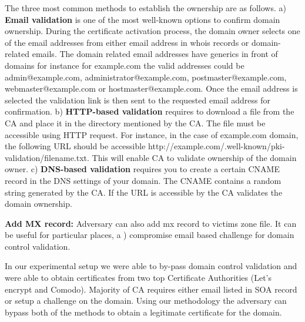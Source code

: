 The three most common methods to establish the ownership are as follows. 
a) \textbf {Email validation} is one of the most well-known options to confirm domain ownership. During the certificate activation process, the domain owner selects one of the email addresses from either email address in whois records or domain-related emails. The domain related email addresses have generics in front of domains for instance for example.com  the valid addresses could be admin@example.com, administrator@example.com, postmaster@example.com, webmaster@example.com or hostmaster@example.com. Once the email address is selected the validation link is then sent to the requested email address for confirmation. b) \textbf{HTTP-based validation} requires to download a file from the CA and place it in the directory mentioned by the CA. The file must be accessible using HTTP request. For instance, in the case of example.com domain, the following URL should be accessible http://example.com/.well-known/pki-validation/filename.txt. This will enable CA to validate ownership of the domain owner. c) \textbf{DNS-based validation} requires you to create a certain CNAME record in the DNS settings of your domain. The CNAME contains a random string generated by the CA. If the URL is accessible by the CA validates the domain ownership. 



\textbf{ Add MX record:} 
Adversary can also add mx record to victims zone file. It can be useful for particular places, a ) compromise email based challenge for domain control validation. %


In our experimental setup we were able to by-pass domain control validation and were able to obtain certificates from two top Certificate Authorities (Let's encrypt and Comodo). Majority of CA requires either email listed in SOA record or setup a challenge on the domain. Using our methodology the adversary can bypass both of the methods to obtain a legitimate certificate for the domain. 